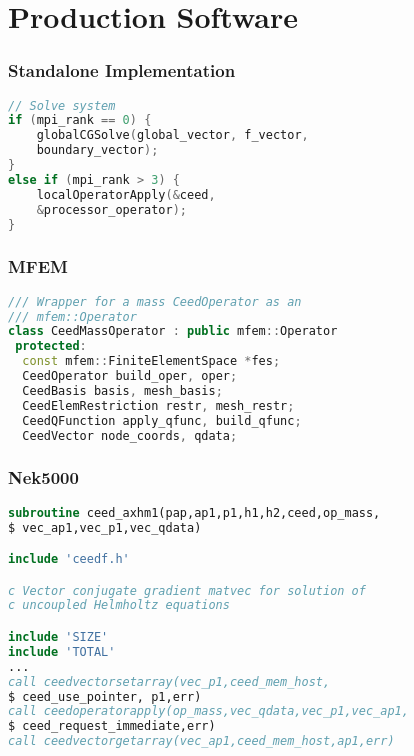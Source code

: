 \documentclass{beamer}
\begin{document}
\section{Production Software}

\begin{frame}[fragile]
\begin{center}
\frametitle{Standalone Implementation}

\begin{lstlisting}[language=C]
// Solve system
if (mpi_rank == 0) {
	globalCGSolve(global_vector, f_vector,
	boundary_vector);
}
else if (mpi_rank > 3) {
	localOperatorApply(&ceed,
	&processor_operator);
}
\end{lstlisting}



\end{center}
\end{frame}


\begin{frame}[fragile]
\begin{center}
\frametitle{MFEM}

{\small
\begin{lstlisting}[language=c++]
/// Wrapper for a mass CeedOperator as an
/// mfem::Operator
class CeedMassOperator : public mfem::Operator
 protected:
  const mfem::FiniteElementSpace *fes;
  CeedOperator build_oper, oper;
  CeedBasis basis, mesh_basis;
  CeedElemRestriction restr, mesh_restr;
  CeedQFunction apply_qfunc, build_qfunc;
  CeedVector node_coords, qdata;

\end{lstlisting}
}

\end{center}
\end{frame}


\begin{frame}[fragile]
\begin{center}
\frametitle{Nek5000}

{\small
\begin{lstlisting}[language=Fortran]
subroutine ceed_axhm1(pap,ap1,p1,h1,h2,ceed,op_mass,
$ vec_ap1,vec_p1,vec_qdata)

include 'ceedf.h'

c Vector conjugate gradient matvec for solution of 
c uncoupled Helmholtz equations

include 'SIZE'
include 'TOTAL'
...
call ceedvectorsetarray(vec_p1,ceed_mem_host,
$ ceed_use_pointer, p1,err)
call ceedoperatorapply(op_mass,vec_qdata,vec_p1,vec_ap1,
$ ceed_request_immediate,err)
call ceedvectorgetarray(vec_ap1,ceed_mem_host,ap1,err)
\end{lstlisting}
}

\end{center}
\end{frame}
\end{document}
